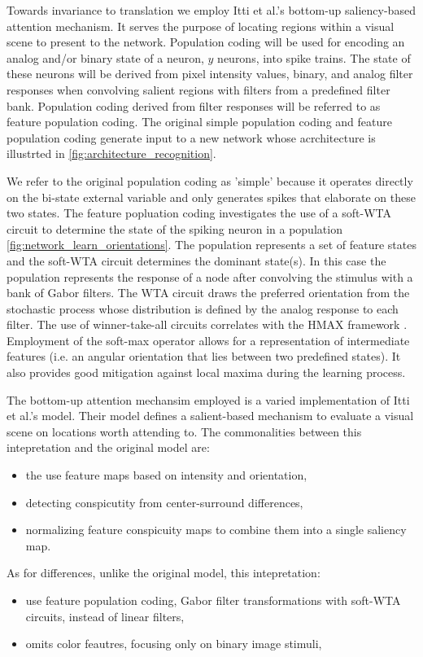 \documentclass{report}
\begin{document}
Towards invariance to translation we employ Itti et al.'s bottom-up saliency-based attention mechanism. It serves the purpose of locating regions within a visual scene to present to the network. Population coding will be used for encoding an analog and/or binary state of a neuron, $y$ neurons, into spike trains. The state of these neurons will be derived from pixel intensity values, binary, and analog filter responses when convolving salient regions with filters from a predefined filter bank. Population coding derived from filter responses will be referred to as feature population coding. The original simple population coding and feature population coding generate input to a new network whose acrchitecture is illustrted in \cref{fig:architecture_recognition}.

We refer to the original population coding as 'simple' because it operates directly on the bi-state external variable and only generates spikes that elaborate on these two states. The feature popluation coding investigates the use of a soft-WTA circuit to determine the state of the spiking neuron in a population \ref{fig:network_learn_orientations}. The population represents a set of feature states and the soft-WTA circuit determines the dominant state(s). In this case the population represents the response of a node after convolving the stimulus with a bank of Gabor filters. The WTA circuit draws the preferred orientation from the stochastic process whose distribution is defined by the analog response to each filter. The use of winner-take-all circuits correlates with the HMAX framework \cite{Serre2004, Riesenhuber1999}. Employment of the soft-max operator allows for a representation of intermediate features (i.e. an angular orientation that lies between two predefined states). It also provides good mitigation against local maxima during the learning process.

The bottom-up attention mechansim employed is a varied implementation of Itti et al.'s model. Their model defines a salient-based mechanism to evaluate a visual scene on locations worth attending to.
The commonalities between this intepretation and the original model are:
\begin{itemize}
  \item the use feature maps based on intensity and orientation,
  \item detecting conspicutity from center-surround differences,
  \item normalizing feature conspicuity maps to combine them into a single saliency map.
\end{itemize}
As for differences, unlike the original model, this intepretation:
\begin{itemize}
  \item use feature population coding, Gabor filter transformations with soft-WTA circuits, instead of linear filters,
  \item omits color feautres, focusing only on binary image stimuli,
\end{itemize}
\end{document}
